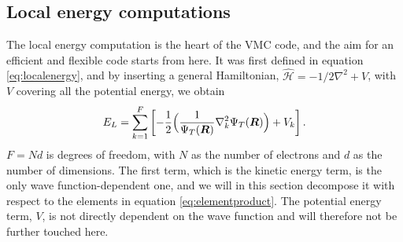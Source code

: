 \subsection{Local energy computations} \label{sec:kinetic}
The local energy computation is the heart of the VMC code, and the aim for an efficient and flexible code starts from here. It was first defined in equation \eqref{eq:localenergy}, and by inserting a general Hamiltonian, $\hat{\mathcal{H}}=-1/2\nabla^2+V$, with $V$ covering all the potential energy, we obtain
\begin{equation}
E_L=\sum_{k=1}^F\left[-\frac{1}{2}\Big(\frac{1}{\Psi_T(\boldsymbol{{R}})}\nabla_k^2\Psi_T(\boldsymbol{{R}})\Big) + V_k\right].
\end{equation}
$F=Nd$ is degrees of freedom, with $N$ as the number of electrons and $d$ as the number of dimensions. The first term, which is the kinetic energy term, is the only wave function-dependent one, and we will in this section decompose it with respect to the elements in equation \eqref{eq:elementproduct}. The potential energy term, $V$, is not directly dependent on the wave function and will therefore not be further touched here. 

